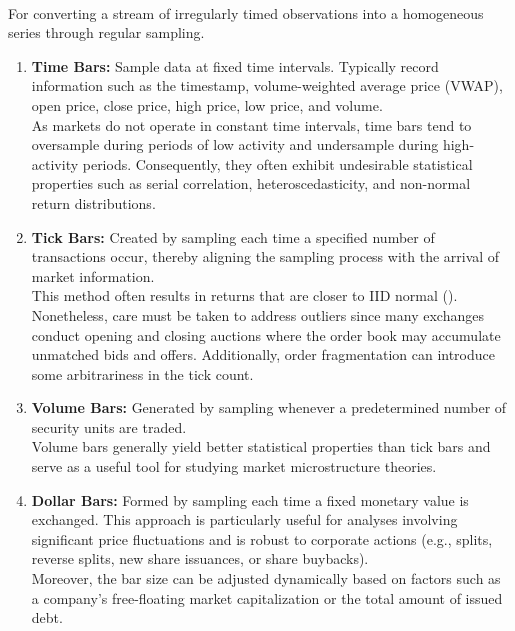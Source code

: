 \begin{remark} \\
For converting a stream of irregularly timed observations into a homogeneous series through regular sampling.
\begin{enumerate}[label=\roman*.]
\setlength{\itemsep}{0pt}
\item \textbf{Time Bars:} Sample data at fixed time intervals. Typically record information such as the timestamp, volume-weighted average price (VWAP), open price, close price, high price, low price, and volume.\\
As markets do not operate in constant time intervals, time bars tend to oversample during periods of low activity and undersample during high-activity periods. Consequently, they often exhibit undesirable statistical properties such as serial correlation, heteroscedasticity, and non-normal return distributions.
\item \textbf{Tick Bars:} Created by sampling each time a specified number of transactions occur, thereby aligning the sampling process with the arrival of market information.\\
This method often results in returns that are closer to IID normal (\cite{Thierry_Helyette_2000}). Nonetheless, care must be taken to address outliers since many exchanges conduct opening and closing auctions where the order book may accumulate unmatched bids and offers. Additionally, order fragmentation can introduce some arbitrariness in the tick count.
\item \textbf{Volume Bars:} Generated by sampling whenever a predetermined number of security units are traded.\\
Volume bars generally yield better statistical properties than tick bars and serve as a useful tool for studying market microstructure theories.
\item \textbf{Dollar Bars:} Formed by sampling each time a fixed monetary value is exchanged. This approach is particularly useful for analyses involving significant price fluctuations and is robust to corporate actions (e.g., splits, reverse splits, new share issuances, or share buybacks).\\
Moreover, the bar size can be adjusted dynamically based on factors such as a company’s free-floating market capitalization or the total amount of issued debt.
\end{enumerate}
\end{remark}

